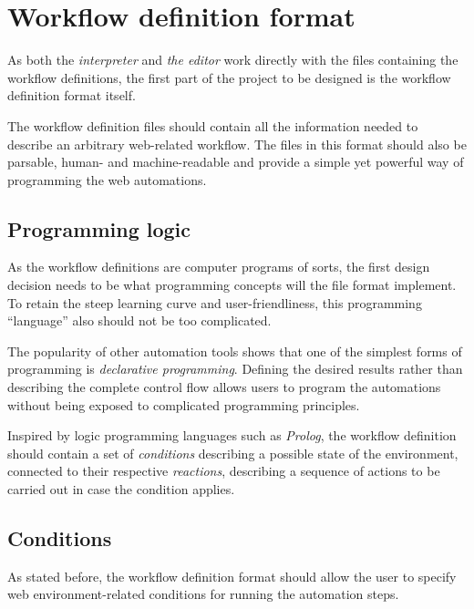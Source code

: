 \section{Workflow definition format}

As both the \textit{interpreter} and \textit{the editor} work directly with the files containing the workflow definitions, the first part of the project to be designed is the workflow definition format itself.

The workflow definition files should contain all the information needed to describe an arbitrary web-related workflow. 
The files in this format should also be parsable, human- and machine-readable and provide a simple yet powerful way of programming the web automations.

\subsection{Programming logic}

As the workflow definitions are computer programs of sorts, the first design decision needs to be what programming concepts will the file format implement.
To retain the steep learning curve and user-friendliness, this programming ``language'' also should not be too complicated.

The popularity of other automation tools shows that one of the simplest forms of programming is \textit{declarative programming}.
Defining the desired results rather than describing the complete control flow allows users to program the automations without being exposed to complicated programming principles.

Inspired by logic programming languages such as \textit{Prolog}, the workflow definition should contain a set of \textit{conditions} describing a possible state of the environment, connected to their respective \textit{reactions}, describing a sequence of actions to be carried out in case the condition applies.


\subsection{Conditions}
\label{conditions}

As stated before, the workflow definition format should allow the user to specify web environment-related conditions for running the automation steps.

